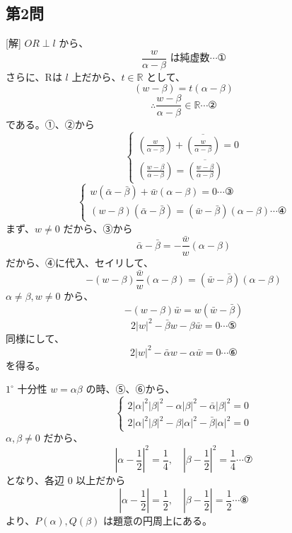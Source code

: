 \documentclass[../main.tex]{subfiles}
\begin{document}
\subsection*{第2問}
[解] $OR \perp l$ から、
\[ \frac{w}{\alpha - \beta} \text{ は純虚数} \cdots \text{①} \]
さらに、Rは $l$ 上だから、$t \in \mathbb{R}$ として、
\[ (w - \beta) = t(\alpha - \beta) \]
\[ \therefore \frac{w-\beta}{\alpha-\beta} \in \mathbb{R} \cdots \text{②} \]
である。①、②から
\[
  \begin{cases} \left( \frac{w}{\alpha-\beta} \right) + \overline{\left( \frac{w}{\alpha-\beta} \right)} = 0 \\ \left( \frac{w-\beta}{\alpha-\beta} \right) = \overline{\left( \frac{w-\beta}{\alpha-\beta} \right)}
\end{cases} \]
\[
  \begin{cases} w(\bar{\alpha}-\bar{\beta}) + \bar{w}(\alpha-\beta) = 0 \cdots \text{③} \\ (w-\beta)(\bar{\alpha}-\bar{\beta}) = (\bar{w}-\bar{\beta})(\alpha-\beta) \cdots \text{④}
\end{cases} \]
まず、$w \neq 0$ だから、③から
\[ \bar{\alpha}-\bar{\beta} = -\frac{\bar{w}}{w}(\alpha-\beta) \]
だから、④に代入、セイリして、
\[ -(w-\beta)\frac{\bar{w}}{w}(\alpha-\beta) = (\bar{w}-\bar{\beta})(\alpha-\beta) \]
$\alpha \neq \beta, w \neq 0$ から、
\[ -(w-\beta)\bar{w} = w(\bar{w}-\bar{\beta}) \]
\[ 2|w|^2 - \bar{\beta}w - \beta\bar{w} = 0 \cdots \text{⑤} \]
同様にして、
\[ 2|w|^2 - \bar{\alpha}w - \alpha\bar{w} = 0 \cdots \text{⑥} \]
を得る。

$1^\circ$ 十分性
$w = \alpha\beta$ の時、⑤、⑥から、
\[
  \begin{cases} 2|\alpha|^2|\beta|^2 - \alpha|\beta|^2 - \bar{\alpha}|\beta|^2 = 0 \\ 2|\alpha|^2|\beta|^2 - \beta|\alpha|^2 - \bar{\beta}|\alpha|^2 = 0
\end{cases} \]
$\alpha, \beta \neq 0$ だから、
\[ \left|\alpha - \frac{1}{2}\right|^2 = \frac{1}{4}, \quad \left|\beta - \frac{1}{2}\right|^2 = \frac{1}{4} \cdots \text{⑦} \]
となり、各辺 $0$ 以上だから
\[ \left|\alpha - \frac{1}{2}\right| = \frac{1}{2}, \quad \left|\beta - \frac{1}{2}\right| = \frac{1}{2} \cdots \text{⑧} \]
より、$P(\alpha), Q(\beta)$ は題意の円周上にある。
\end{document}
